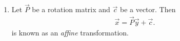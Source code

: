 \begin{enumerate}[label=\arabic*.,ref=\thesubsection.\theenumi]
\item Let $\vec{P}$ be a rotation matrix and  $\vec{c}$ be a vector. Then 
\begin{align}
\vec{x} = \vec{P}\vec{y}+\vec{c}.
\label{eq:affine}
\end{align}
 is known as an {\em affine} transformation.
\end{enumerate}
